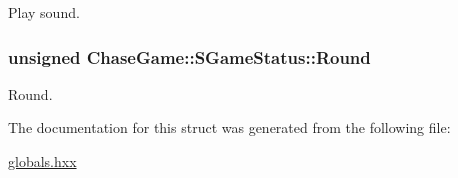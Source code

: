 Play sound. 

\hypertarget{struct_chase_game_1_1_s_game_status_afd8742d8a27af58077d4a9fe9f9b1c4f}{
\subsubsection[{Round}]{\setlength{\rightskip}{0pt plus 5cm}unsigned Chase\-Game\-::\-S\-Game\-Status\-::\-Round}}\label{struct_chase_game_1_1_s_game_status_afd8742d8a27af58077d4a9fe9f9b1c4f}


Round. 



The documentation for this struct was generated from the following file\-:\begin{DoxyCompactItemize}
\item 
\hyperlink{globals_8hxx}{globals.\-hxx}\end{DoxyCompactItemize}
